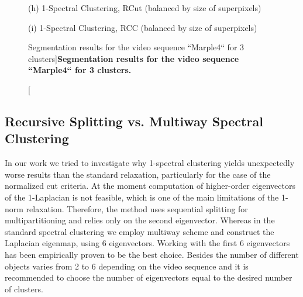 \begin{figure}[ht!]
\begin{minipage}[t]{1\textwidth}
\footnotesize (h) 1-Spectral Clustering, RCut (balanced by size of superpixels)
\end{minipage}
\begin{minipage}[t]{1\textwidth}
\centering
\hfill \hfill  \hfill
\hfill
{}
\hfill
{}
\hfill
{}
\hfill \hfill  \hfill

\footnotesize (i) 1-Spectral Clustering, RCC (balanced by size of superpixels)
\end{minipage}
 \caption[Segmentation results for the video sequence ``Marple4`` for 3 clusters]{
  {\bf Segmentation results for the video sequence ``Marple4`` for 3 clusters.}}
\label{fig:seg_res_M4}
\end{figure}

\clearpage
\newpage
\subsection{Recursive Splitting vs. Multiway Spectral Clustering}
In our work we tried to investigate why 1-spectral clustering yields unexpectedly worse results than the standard relaxation, particularly for the case of the normalized cut criteria.
At the moment computation of higher-order eigenvectors of the 1-Laplacian is not feasible, which is one of the main limitations of the 1-norm relaxation. Therefore, the method 
uses sequential splitting for multipartitioning and relies only on the second eigenvector. Whereas in the standard spectral clustering we employ multiway scheme and construct the Laplacian eigenmap, using 6 eigenvectors. 
Working with the first 6 eigenvectors has been empirically proven to be the best choice. Besides the number of different objects varies from 2 to 6 depending on the video sequence and it is recommended to choose the
number of eigenvectors equal to the desired number of clusters. 

